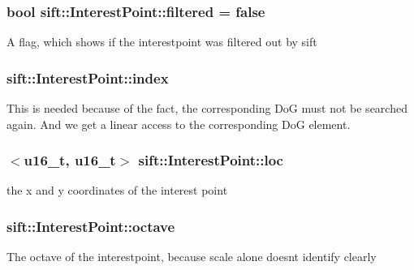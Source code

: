 \subsubsection[{filtered}]{\setlength{\rightskip}{0pt plus 5cm}bool sift\+::\+Interest\+Point\+::filtered = false}\label{structsift_1_1InterestPoint_a613fd840fa925b4885d5228fd2c1290c}
A flag, which shows if the interestpoint was filtered out by sift \hypertarget{structsift_1_1InterestPoint_a9ec87bddea9e66a5e7e655ddf6483799}{}
\subsubsection[{index}]{ sift\+::\+Interest\+Point\+::index}\label{structsift_1_1InterestPoint_a9ec87bddea9e66a5e7e655ddf6483799}
This is needed because of the fact, the corresponding Do\+G must not be searched again. And we get a linear access to the corresponding Do\+G element. \hypertarget{structsift_1_1InterestPoint_a843e9ca44ce7ddefead792ca4c787f20}{}
\subsubsection[{loc}]{$<${\bf u16\+\_\+t}, {\bf u16\+\_\+t}$>$ sift\+::\+Interest\+Point\+::loc}\label{structsift_1_1InterestPoint_a843e9ca44ce7ddefead792ca4c787f20}
the x and y coordinates of the interest point \hypertarget{structsift_1_1InterestPoint_a2daaf1185f5658cabc2e8a3768b7f321}{}
\subsubsection[{octave}]{ sift\+::\+Interest\+Point\+::octave}\label{structsift_1_1InterestPoint_a2daaf1185f5658cabc2e8a3768b7f321}
The octave of the interestpoint, because scale alone doesn\textquotesingle{}t identify clearly \hypertarget{structsift_1_1InterestPoint_adbf265440c475aad71f31d8e81306a8b}{}
